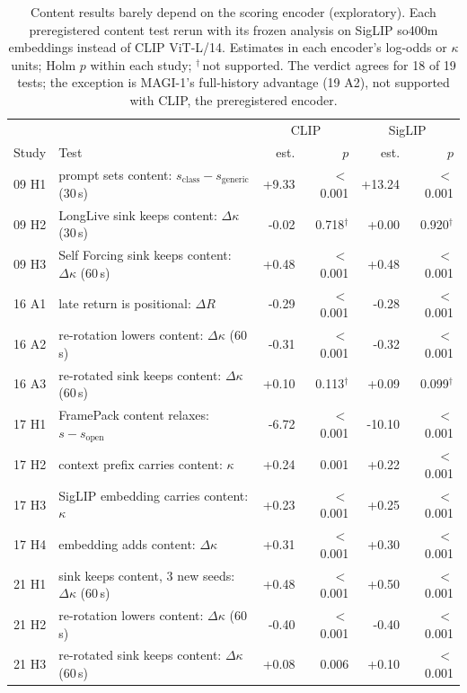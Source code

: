 \begin{table}[h]
\centering\scriptsize
\caption{Content results barely depend on the scoring encoder (exploratory). Each preregistered content test rerun with
its frozen analysis on SigLIP so400m embeddings instead of CLIP ViT-L/14. Estimates in each encoder's log-odds or
$\kappa$ units; Holm $p$ within each study; $^\dagger$\,not supported. The verdict agrees for 18 of 19 tests; the exception is MAGI-1's full-history advantage (19 A2), not
supported with CLIP, the preregistered encoder.}
\label{tab:encoder}
\begin{tabular}{@{}llrrrr@{}}
\toprule
& & \multicolumn{2}{c}{CLIP} & \multicolumn{2}{c}{SigLIP} \\
Study & Test & est. & $p$ & est. & $p$ \\
\midrule
09 H1 & prompt sets content: $s_{\text{class}} - s_{\text{generic}}$ (30\,s) & +9.33 & $<$0.001 & +13.24 & $<$0.001 \\
09 H2 & LongLive sink keeps content: $\Delta\kappa$ (30\,s) & -0.02 & 0.718$^\dagger$ & +0.00 & 0.920$^\dagger$ \\
09 H3 & Self Forcing sink keeps content: $\Delta\kappa$ (60\,s) & +0.48 & $<$0.001 & +0.48 & $<$0.001 \\
16 A1 & late return is positional: $\Delta R$ & -0.29 & $<$0.001 & -0.28 & $<$0.001 \\
16 A2 & re-rotation lowers content: $\Delta\kappa$ (60\,s) & -0.31 & $<$0.001 & -0.32 & $<$0.001 \\
16 A3 & re-rotated sink keeps content: $\Delta\kappa$ (60\,s) & +0.10 & 0.113$^\dagger$ & +0.09 & 0.099$^\dagger$ \\
17 H1 & FramePack content relaxes: $s - s_{\text{open}}$ & -6.72 & $<$0.001 & -10.10 & $<$0.001 \\
17 H2 & context prefix carries content: $\kappa$ & +0.24 & 0.001 & +0.22 & $<$0.001 \\
17 H3 & SigLIP embedding carries content: $\kappa$ & +0.23 & $<$0.001 & +0.25 & $<$0.001 \\
17 H4 & embedding adds content: $\Delta\kappa$ & +0.31 & $<$0.001 & +0.30 & $<$0.001 \\
21 H1 & sink keeps content, 3 new seeds: $\Delta\kappa$ (60\,s) & +0.48 & $<$0.001 & +0.50 & $<$0.001 \\
21 H2 & re-rotation lowers content: $\Delta\kappa$ (60\,s) & -0.40 & $<$0.001 & -0.40 & $<$0.001 \\
21 H3 & re-rotated sink keeps content: $\Delta\kappa$ (60\,s) & +0.08 & 0.006 & +0.10 & $<$0.001 \\

\end{tabular}
\end{table}
